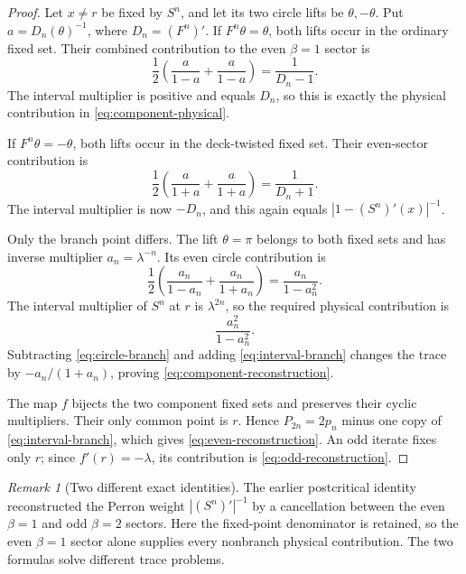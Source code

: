 \documentclass[11pt]{article}
\theoremstyle{definition}
\theoremstyle{remark}
\newtheorem{remark}[theorem]{Remark}
\begin{document}
\begin{proof}
Let $x\ne r$ be fixed by $S^n$, and let its two circle lifts be
$\theta,-\theta$.  Put $a=D_n(\theta)^{-1}$, where
$D_n=(F^n)'$.  If $F^n\theta=\theta$, both lifts occur in the ordinary fixed
set.  Their combined contribution to the even $\beta=1$ sector is
\[
 \frac12\left(\frac a{1-a}+\frac a{1-a}\right)
 =\frac1{D_n-1}.
\]
The interval multiplier is positive and equals $D_n$, so this is exactly the
physical contribution in \eqref{eq:component-physical}.

If $F^n\theta=-\theta$, both lifts occur in the deck-twisted fixed set.  Their
even-sector contribution is
\[
 \frac12\left(\frac a{1+a}+\frac a{1+a}\right)
 =\frac1{D_n+1}.
\]
The interval multiplier is now $-D_n$, and this again equals
$|1-(S^n)'(x)|^{-1}$.

Only the branch point differs.  The lift $\theta=\pi$ belongs to both fixed
sets and has inverse multiplier $a_n=\lambda^{-n}$.  Its even circle
contribution is
\begin{equation}\label{eq:circle-branch}
 \frac12\left(\frac{a_n}{1-a_n}+\frac{a_n}{1+a_n}\right)
 =\frac{a_n}{1-a_n^2}.
\end{equation}
The interval multiplier of $S^n$ at $r$ is $\lambda^{2n}$, so the required
physical contribution is
\begin{equation}\label{eq:interval-branch}
 \frac{a_n^2}{1-a_n^2}.
\end{equation}
Subtracting \eqref{eq:circle-branch} and adding
\eqref{eq:interval-branch} changes the trace by
$-a_n/(1+a_n)$, proving \eqref{eq:component-reconstruction}.

The map $f$ bijects the two component fixed sets and preserves their cyclic
multipliers.  Their only common point is $r$.  Hence $P_{2n}=2p_n$ minus one
copy of \eqref{eq:interval-branch}, which gives
\eqref{eq:even-reconstruction}.  An odd iterate fixes only $r$; since
$f'(r)=-\lambda$, its contribution is \eqref{eq:odd-reconstruction}.
\end{proof}

\begin{remark}[Two different exact identities]
The earlier postcritical identity reconstructed the Perron weight
$|(S^n)'|^{-1}$ by a cancellation between the even $\beta=1$ and odd
$\beta=2$ sectors.  Here the fixed-point denominator is retained, so the
even $\beta=1$ sector alone supplies every nonbranch physical contribution.
The two formulas solve different trace problems.
\end{remark}
\end{document}
